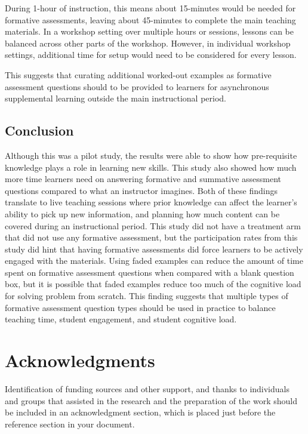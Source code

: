 \documentclass[acmsmall]{acmart}
\begin{document}
During 1-hour of instruction, this means about 15-minutes would be needed for formative assessments,
leaving about 45-minutes to complete the main teaching materials.
In a workshop setting over multiple hours or sessions, lessons can be balanced across other parts of the workshop.
However, in individual workshop settings, additional time for setup would need to be
considered for every lesson.

This suggests that curating additional worked-out examples as formative assessment questions
should to be provided to learners
for asynchronous supplemental learning outside the main instructional period.

\subsection{Conclusion}

Although this was a pilot study, the results were able to show how pre-requisite knowledge plays a
role in learning new skills.
This study also showed how much more time learners need on answering formative and summative assessment questions compared to what an instructor imagines.
Both of these findings translate to live teaching sessions where prior knowledge can affect the learner's ability to pick up new information,
and planning how much content can be covered during an instructional period.
This study did not have a treatment arm that did not use any formative assessment,
but the participation rates from this study did hint that having formative assessments did force learners to be actively engaged with
the materials.
Using faded examples can reduce the amount of time spent on formative assessment questions when compared with a blank question box,
but it is possible that faded examples reduce too much of the cognitive load for solving problem from scratch.
This finding suggests that multiple types of formative assessment question types should be used in practice to balance
teaching time, student engagement, and student cognitive load.


\section{Acknowledgments}

Identification of funding sources and other support, and thanks to
individuals and groups that assisted in the research and the
preparation of the work should be included in an acknowledgment
section, which is placed just before the reference section in your
document.
\end{document}
